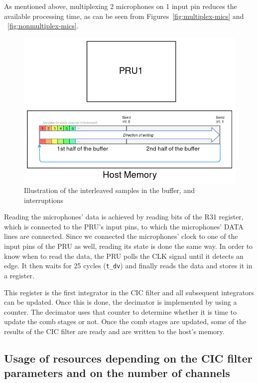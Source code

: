 \documentclass[]{report}
\begin{document}
As mentioned above, multiplexing 2 microphones on 1 input pin reduces
the available processing time, as can be seen from Figures~\ref{fig:multiplex-mics} and ~\ref{fig:nonmultiplex-mics}.

\begin{figure}
\centering
\includegraphics[width=0.8\linewidth]{Pictures/PRU_buffer.png}
\caption{Illustration of the interleaved samples in the buffer, and
interruptions}
\end{figure}

Reading the microphones' data is achieved by reading bits of the R31 register, which is connected to the PRU's input pins, to which the microphones' DATA lines are connected. Since we connected the microphones' clock to one of the input pins of the PRU as well, reading its state is done the same way. In order to know when to read the data, the PRU polls the CLK signal until it detects an edge. It then waits for 25 cycles (\texttt{t\_dv}) and finally reads the data and stores it in a register.

This register is the first integrator in the CIC filter and all subsequent integrators can be updated. Once this is done, the decimator is implemented by using a counter. The decimator uses that counter to determine whether it is time to update the comb stages or not. Once the comb stages are updated, some of the results of the CIC filter are ready and are written to the host's memory.

\hypertarget{usage-of-resources-depending-on-the-cic-filter-parameters-n-m-r-and-on-the-number-of-channels-c}{%
\subsection{\texorpdfstring{Usage of resources depending on the CIC
filter parameters and on the number of channels}{Usage of resources depending on the CIC filter parameters N, M, R and on the number of channels C}}\label{usage-of-resources-depending-on-the-cic-filter-parameters-n-m-r-and-on-the-number-of-channels-c}}
\end{document}
